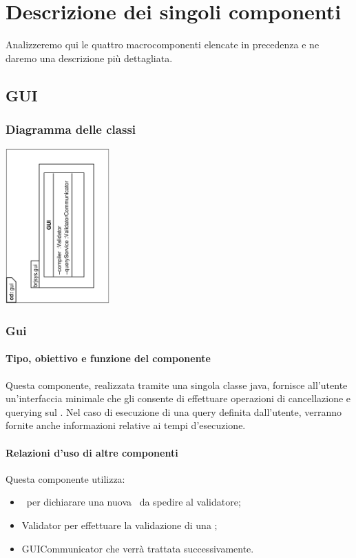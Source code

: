 \documentclass[11pt,titlepage,a4paper]{report}
\begin{document}
\chapter{Descrizione dei singoli componenti}
Analizzeremo qui le quattro macrocomponenti elencate in precedenza e ne daremo una descrizione pi\`u dettagliata.

\section{GUI}
\subsection{Diagramma delle classi}
\begin{center}
\includegraphics[width=0.3\textwidth, angle=-90]{DiagrammaClassi/gui.eps}
\end{center}
\subsection{Gui}
\subsubsection{Tipo, obiettivo e funzione del componente}
Questa componente, realizzata tramite una singola classe java, fornisce all'utente un'interfaccia minimale che gli consente di effettuare operazioni di cancellazione e querying sul \re. Nel caso di esecuzione di una query definita dall'utente, verranno fornite anche informazioni relative ai tempi d'esecuzione.
\subsubsection{Relazioni d'uso di altre componenti}
Questa componente utilizza:
\begin{itemize}
 \item \BR\ per dichiarare una nuova \br\ da spedire al validatore;
 \item Validator per effettuare la validazione di una \br;
 \item GUICommunicator che verr\`a trattata successivamente.
\end{itemize}
\end{document}
